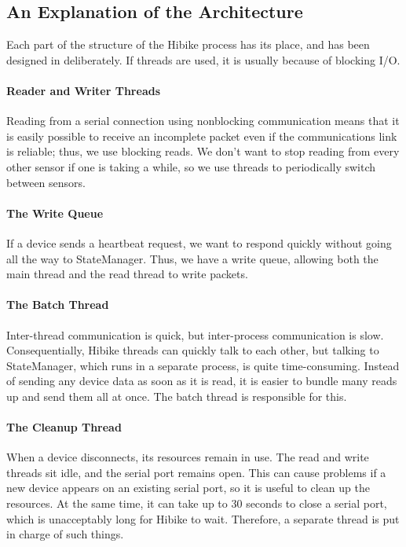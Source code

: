\documentclass[12pt]{book}
\begin{document}
\subsection{An Explanation of the Architecture}
Each part of the structure of the Hibike process has its place, and has
been designed in deliberately. If threads are used, it is usually because
of blocking I/O.

\paragraph{Reader and Writer Threads}
Reading from a serial connection using nonblocking communication means that it
is easily possible to receive an incomplete packet even if the communications
link is reliable; thus, we use blocking reads. We don't want to stop reading
from every other sensor if one is taking a while, so we use threads to
periodically switch between sensors.

\paragraph{The Write Queue}
If a device sends a heartbeat request, we want to respond quickly
without going all the way to StateManager. Thus, we have a write queue, allowing
both the main thread and the read thread to write packets.

\paragraph{The Batch Thread}
Inter-thread communication is quick, but inter-process communication is slow.
Consequentially,
Hibike threads can quickly talk to each other, but talking to StateManager, which
runs in a separate process, is quite time-consuming. Instead of
sending any device data as soon as it is read, it is easier to bundle many
reads up and send them all at once. The batch thread is responsible for this.

\paragraph{The Cleanup Thread}
When a device disconnects, its resources remain in use. The read
and write threads sit idle, and the serial port remains open. This
can cause problems if a new device appears on an existing serial port,
so it is useful to clean up the resources. At the same time, it
can take up to 30 seconds to close a serial port, which is unacceptably
long for Hibike to wait. Therefore, a separate thread is put in charge
of such things.
\end{document}
